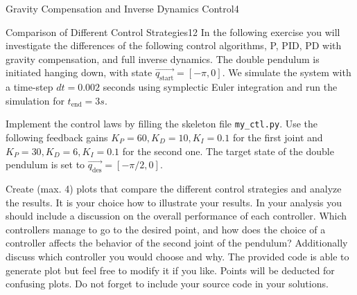 \begin{questions}
\begin{question}{Gravity Compensation and Inverse Dynamics Control}{4}
	\end{question}
	
	
	\begin{question}{Comparison of Different Control Strategies}{12}
		In the following exercise you will investigate the differences of the following control algorithms, P, PID, PD with gravity compensation, and full inverse dynamics.
		The double pendulum is initiated hanging down, with state $\vec{q_\textrm{start}}={[-\pi,0]}$. We simulate the system with a time-step $dt=0.002$ seconds using symplectic Euler integration and run the simulation for $t_\textrm{end}=3s$. 
		
		Implement the control laws by filling the skeleton file \texttt{my\_ctl.py}. Use the following feedback gains $K_P=60, K_D=10, K_I=0.1$ for the first joint and $K_P=30, K_D=6, K_I=0.1$ for the second one.
		The target state of the double pendulum is set to $\vec{q_\textrm{des}}={[-\pi / 2,0]}$. 
		
		Create (max. 4) plots that compare the different control strategies and analyze the results. It is your choice how to illustrate your results. In your analysis you should include a discussion on the overall performance of each controller. Which controllers manage to go to the desired point, and how does the choice of a controller affects the behavior of the second joint of the pendulum? Additionally discuss which controller you would choose and why. The provided code is able to generate plot but feel free to modify it if you like. Points will be deducted for confusing plots. Do not forget to include your source code in your solutions.
		

\end{question}
\end{questions}

